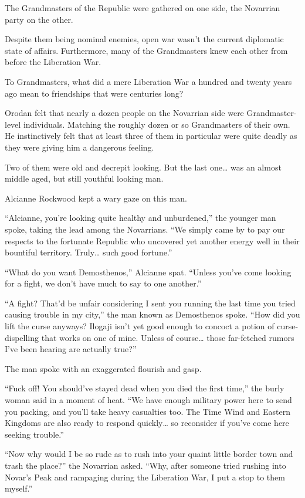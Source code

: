 \documentclass[a4paper,10pt]{book}
\begin{document}
\par
The Grandmasters of the Republic were gathered on one side, the Novarrian party on the other.\par
Despite them being nominal enemies, open war wasn’t the current diplomatic state of affairs. Furthermore, many of the Grandmasters knew each other from before the Liberation War.\par
To Grandmasters, what did a mere Liberation War a hundred and twenty years ago mean to friendships that were centuries long?\par
Orodan felt that nearly a dozen people on the Novarrian side were Grandmaster-level individuals. Matching the roughly dozen or so Grandmasters of their own. He instinctively felt that at least three of them in particular were quite deadly as they were giving him a dangerous feeling.\par
Two of them were old and decrepit looking. But the last one… was an almost middle aged, but still youthful looking man.\par
Alcianne Rockwood kept a wary gaze on this man.\par
“Alcianne, you’re looking quite healthy and unburdened,” the younger man spoke, taking the lead among the Novarrians. “We simply came by to pay our respects to the fortunate Republic who uncovered yet another energy well in their bountiful territory. Truly… such good fortune.”\par
“What do you want Demosthenos,” Alcianne spat. “Unless you’ve come looking for a fight, we don’t have much to say to one another.”\par
“A fight? That’d be unfair considering I sent you running the last time you tried causing trouble in my city,” the man known as Demosthenos spoke. “How did you lift the curse anyways? Ilogaji isn’t yet good enough to concoct a potion of curse-dispelling that works on one of mine. Unless of course… those far-fetched rumors I’ve been hearing are actually true?”\par
The man spoke with an exaggerated flourish and gasp.\par
“Fuck off! You should’ve stayed dead when you died the first time,” the burly woman said in a moment of heat. “We have enough military power here to send you packing, and you’ll take heavy casualties too. The Time Wind and Eastern Kingdoms are also ready to respond quickly… so reconsider if you've come here seeking trouble.”\par
“Now why would I be so rude as to rush into your quaint little border town and trash the place?” the Novarrian asked. “Why, after someone tried rushing into Novar’s Peak and rampaging during the Liberation War, I put a stop to them myself.”\par
\end{document}

